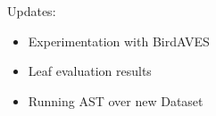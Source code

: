 





\begin{frame}{Updates:}
    \begin{itemize}
        \item Experimentation with BirdAVES
        \item Leaf evaluation results
        \item Running AST over new Dataset
    \end{itemize}    
\end{frame}

